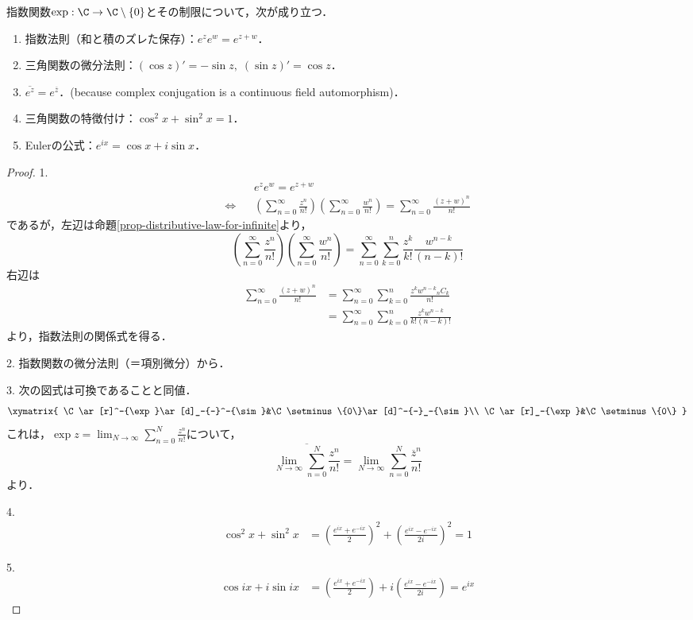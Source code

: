 \documentclass[uplatex, dvipdfmx]{jsreport}
\begin{document}
\begin{proposition}
    指数関数$\exp:\C\to\C\setminus\{0\}$とその制限について，次が成り立つ．
    \begin{enumerate}
        \item 指数法則（和と積のズレた保存）：$e^ze^w=e^{z+w}$．
        \item 三角関数の微分法則：$(\cos z)'=-\sin z,\;(\sin z)'=\cos z$．
        \item $\overline{e^z}=e^{\overline{z}}$．(because complex conjugation is a continuous field automorphism)．
        \item 三角関数の特徴付け：$\cos^2x+\sin^2x=1$．
        \item Eulerの公式：$e^{ix}=\cos x+i\sin x$．
    \end{enumerate}
\end{proposition}
\begin{proof}
    1. \begin{align*}
        &e^ze^w=e^{z+w}\\ \Leftrightarrow\;\;\;&\left(\sum^\infty_{n=0}\frac{z^n}{n!}\right)\left(\sum^\infty_{n=0}\frac{w^n}{n!}\right)=\sum^\infty_{n=0}\frac{(z+w)^n}{n!}
    \end{align*}
    であるが，左辺は命題\ref{prop-distributive-law-for-infinite}より，
    \[ \left(\sum^\infty_{n=0}\frac{z^n}{n!}\right)\left(\sum^\infty_{n=0}\frac{w^n}{n!}\right) = \sum^\infty_{n=0}\sum^n_{k=0}\frac{z^k}{k!}\frac{w^{n-k}}{(n-k)!} \]
    右辺は
    \begin{align*}
        \sum^\infty_{n=0}\frac{(z+w)^n}{n!} &= \sum^\infty_{n=0}\sum^n_{k=0}\frac{z^kw^{n-k}{}_nC_k}{n!}\\
        &= \sum^\infty_{n=0}\sum^n_{k=0}\frac{z^kw^{n-k}}{k!(n-k)!}
    \end{align*}
    より，指数法則の関係式を得る．

    2. 指数関数の微分法則（＝項別微分）から．

    3. 次の図式は可換であることと同値．
    \[\xymatrix{
        \C\ar[r]^-{\exp}\ar[d]_-{-}^-{\sim}&\C\setminus\{0\}\ar[d]^-{-}_-{\sim}\\
        \C\ar[r]_-{\exp}&\C\setminus\{0\}
    }\]
    これは，$\exp z=\lim_{N\to\infty}\sum^N_{n=0}\frac{z^n}{n!}$について，
    \[ \overline{\lim_{N\to\infty}\sum^N_{n=0}\frac{z^n}{n!}} = \lim_{N\to\infty}\sum^N_{n=0}\frac{\overline{z}^n}{n!} \]
    より．

    4. 
    \begin{align*}
        \cos^2 x+\sin^2 x  &= \left(\frac{e^{ix}+e^{-ix}}{2}\right)^2 + \left(\frac{e^{ix}-e^{-ix}}{2i}\right)^2= 1
    \end{align*}

    5.
    \begin{align*}
        \cos ix+i\sin ix  &= \left(\frac{e^{ix}+e^{-ix}}{2}\right) + i\left(\frac{e^{ix}-e^{-ix}}{2i}\right)= e^{ix}
    \end{align*}
\end{proof}
\end{document}
